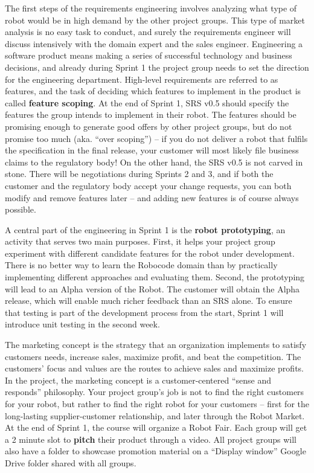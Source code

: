 \documentclass{scrreprt}
\begin{document}
The first steps of the requirements engineering involves analyzing what type of robot would be in high demand by the other project groups. This type of market analysis is no easy task to conduct, and surely the requirements engineer will discuss intensively with the domain expert and the sales engineer. Engineering a software product means making a series of successful technology and business decisions, and already during Sprint 1 the project group needs to set the direction for the engineering department. High-level requirements are referred to as features, and the task of deciding which features to implement in the product is called \textbf{feature scoping}. At the end of Sprint 1, SRS v0.5 should specify the features the group intends to implement in their robot. The features should be promising enough to generate good offers by other project groups, but do not promise too much (aka. ``over scoping'') -- if you do not deliver a robot that fulfils the specification in the final release, your customer will most likely file business claims to the regulatory body! On the other hand, the SRS v0.5 is not carved in stone. There will be negotiations during Sprints 2 and 3, and if both the customer and the regulatory body accept your change requests, you can both modify and remove features later -- and adding new features is of course always possible.

A central part of the engineering in Sprint 1 is the \textbf{robot prototyping}, an activity that serves two main purposes. First, it helps your project group experiment with different candidate features for the robot under development. There is no better way to learn the Robocode domain than by practically implementing different approaches and evaluating them. Second, the prototyping will lead to an Alpha version of the Robot. The customer will obtain the Alpha release, which will enable much richer feedback than an SRS alone. To ensure that testing is part of the development process from the start, Sprint 1 will introduce unit testing in the second week.

The marketing concept is the strategy that an organization implements to satisfy customers needs, increase sales, maximize profit, and beat the competition. The customers' focus and values are the routes to achieve sales and maximize profits. In the project, the marketing concept is a customer-centered ``sense and responds'' philosophy. Your project group's job is not to find the right customers for your robot, but rather to find the right robot for your customers -- first for the long-lasting supplier-customer relationship, and later through the Robot Market. At the end of Sprint 1, the course will organize a Robot Fair. Each group will get a 2 minute slot to \textbf{pitch} their product through a video. All project groups will also have a folder to showcase promotion material on a ``Display window'' Google Drive folder shared with all groups.
\end{document}
